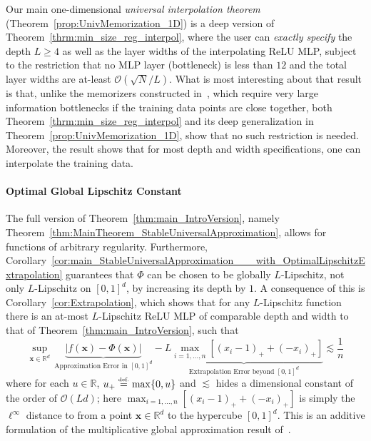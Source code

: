 \documentclass{article}
\numberwithin{equation}{section}
\theoremstyle{definition}
\newcommand{\eqdef}{\ensuremath{\stackrel{\mbox{\upshape\tiny def.}}{=}}}
\begin{document}
Our main one-dimensional \textit{universal interpolation theorem} (Theorem~\ref{prop:UnivMemorization_1D}) is a deep version of Theorem~\ref{thrm:min_size_reg_interpol}, where the user can \textit{exactly specify} the depth $L\ge 4$ as well as the layer widths of the interpolating ReLU MLP, subject to the restriction that no MLP layer (bottleneck) is less than $12$ and the total layer widths are at-least $\mathcal{O}(\sqrt{N}/L)$.  What is most interesting about that result is that, unlike the memorizers constructed in~\cite{vershynin2020memory}, which require very large information bottlenecks if the training data points are close together, both Theorem~\ref{thrm:min_size_reg_interpol} and its deep generalization in Theorem~\ref{prop:UnivMemorization_1D}, show that no such restriction is needed.  Moreover, the result shows that for most depth and width specifications, one can interpolate the training data.  

\paragraph{Optimal Global Lipschitz Constant}
The full version of Theorem~\ref{thm:main_IntroVersion}, namely Theorem~\ref{thm:MainTheorem_StableUniversalApproximation}, allows for functions of arbitrary regularity.  Furthermore, Corollary~\ref{cor:main_StableUniversalApproximation___with_OptimalLipschitzExtrapolation} guarantees that $\Phi$ can be chosen to be globally $L$-Lipschitz, not only $L$-Lipschitz on $[0,1]^d$, by increasing its depth by $1$.  A consequence of this is Corollary~\ref{cor:Extrapolation}, which shows that for any $L$-Lipschitz function there is an at-most $L$-Lipschitz ReLU MLP of comparable depth and width to that of Theorem~\ref{thm:main_IntroVersion}, such that
\[
    \sup_{\mathbf{x}\in \mathbb{R}^d}
    \,
        \underbrace{
            |f(\mathbf{x})-\Phi(\mathbf{x})|
        }_{\text{Approximation Error in }[0,1]^d}
        -
        \underbrace{
            L\max_{i=1,\dots,n} [(x_i-1)_+ + (-x_i)_+]
        }_{\text{Extrapolation Error beyond }[0,1]^d}
    \lesssim 
        \frac{1}{n}
\]
where for each $u\in\mathbb{R}$, $u_+\eqdef \max\{0,u\}$ and $\lesssim$ hides a dimensional constant of the order of $\mathcal{O}(Ld)$; here $\max_{i=1,\dots,n} [(x_i-1)_+ + (-x_i)_+]$ is simply the $\ell^{\infty}$ distance to from a point $\mathbf{x}\in \mathbb{R}^d$ to the hypercube $[0,1]^d$.
This is an additive formulation of the multiplicative global approximation result of~\cite{cuchiero2023global}.
\end{document}
